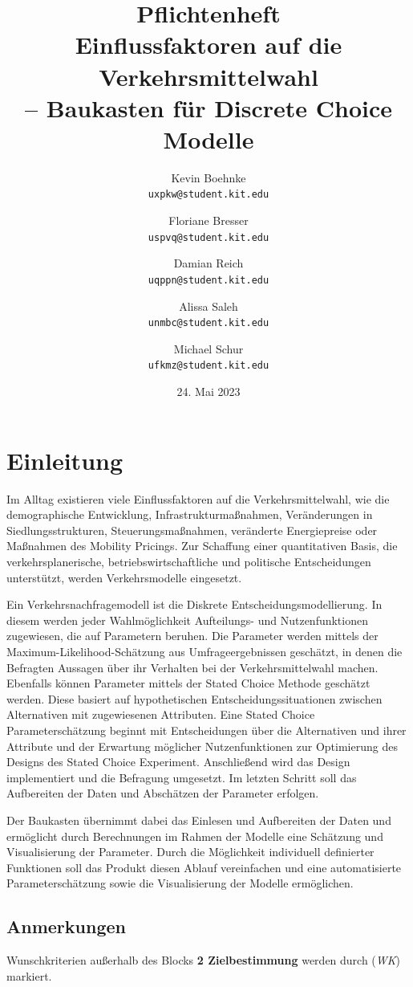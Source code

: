\documentclass{article}
\title{Pflichtenheft \\ \large Einflussfaktoren auf die Verkehrsmittelwahl\\ -- Baukasten für Discrete Choice Modelle}
\author{Kevin Boehnke \\ \texttt{uxpkw@student.kit.edu}
\and Floriane Bresser \\ \texttt{uspvq@student.kit.edu}
\and Damian Reich \\ \texttt{uqppn@student.kit.edu}
\and Alissa Saleh \\ \texttt{unmbc@student.kit.edu}
\and Michael Schur \\ \texttt{ufkmz@student.kit.edu}}
\date{24. Mai 2023}
\begin{document}
\clearpage\maketitle\thispagestyle{empty}
\newpage
\clearpage\tableofcontents\thispagestyle{empty}
\newpage
{}

\section{Einleitung}

Im Alltag existieren viele Einflussfaktoren auf die Verkehrsmittelwahl, wie die demographische Entwicklung, Infrastrukturmaßnahmen, Veränderungen in Siedlungsstrukturen, Steuerungsmaßnahmen, veränderte Energiepreise oder Maßnahmen des Mobility Pricings. Zur Schaffung einer quantitativen Basis, die verkehrsplanerische, betriebswirtschaftliche und politische Entscheidungen unterstützt, werden Verkehrsmodelle eingesetzt.\newline

Ein Verkehrsnachfragemodell ist die Diskrete Entscheidungsmodellierung. In diesem werden jeder Wahlmöglichkeit Aufteilungs- und Nutzenfunktionen zugewiesen, die auf Parametern beruhen. Die Parameter werden mittels der Maximum-Likelihood-Schätzung aus Umfrageergebnissen geschätzt, in denen die Befragten Aussagen über ihr Verhalten bei der Verkehrsmittelwahl machen. Ebenfalls können Parameter mittels der Stated Choice Methode geschätzt werden. Diese basiert auf hypothetischen Entscheidungssituationen zwischen Alternativen mit zugewiesenen Attributen. Eine Stated Choice Parameterschätzung beginnt mit Entscheidungen über die Alternativen und ihrer Attribute und der Erwartung möglicher Nutzenfunktionen zur Optimierung des Designs des Stated Choice Experiment. Anschließend wird das Design implementiert und die Befragung umgesetzt. Im letzten Schritt soll das Aufbereiten der Daten und Abschätzen der Parameter erfolgen.\newline

Der Baukasten übernimmt dabei das Einlesen und Aufbereiten der Daten und ermöglicht durch Berechnungen im Rahmen der Modelle eine Schätzung und Visualisierung der Parameter. Durch die Möglichkeit individuell definierter Funktionen soll das Produkt diesen Ablauf vereinfachen und eine automatisierte Parameterschätzung sowie die Visualisierung der Modelle ermöglichen. 

\subsection{Anmerkungen}
Wunschkriterien außerhalb des Blocks \textbf{2 Zielbestimmung} werden durch (\textit{WK}) markiert.
\end{document}
